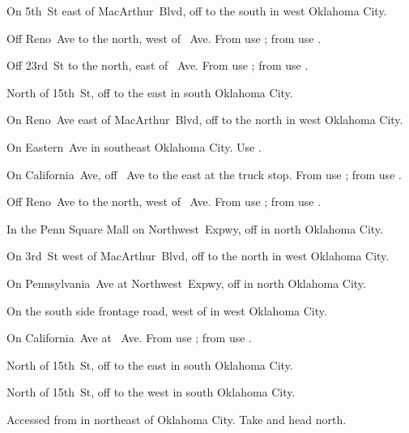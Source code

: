 
\begin{LocationList}

On 5th~St east of MacArthur~Blvd, off   to the south in west Oklahoma City.

Off Reno~Ave to the north, west of \MLKing~Ave.
From  use ; from  use .
	
Off 23rd~St to the north, east of \MLKing~Ave.
From  use ; from  use .

North of 15th~St, off   to the east in south Oklahoma City.

On Reno~Ave east of MacArthur~Blvd, off   to the north in west Oklahoma City.

\Location{\GarageHQ \Garage}
On Eastern~Ave in southeast Oklahoma City.
Use  .

On California~Ave, off \MLKing~Ave to the east at the truck stop.
From  use ; from  use .

Off Reno~Ave to the north, west of \MLKing~Ave.
From  use ; from  use .

In the Penn Square Mall on Northwest~Expwy, off  in north Oklahoma City.

On 3rd~St west of MacArthur~Blvd, off   to the north in west Oklahoma City.

On Pennsylvania~Ave at Northwest~Expwy, off  in north Oklahoma City.

On the south side  frontage road, west of  in west Oklahoma City.

\Location{\TruckStop \Gas \Rest \Service \Weigh}
On California~Ave at \MLKing~Ave.
From  use ; from  use .

North of 15th~St, off   to the east in south Oklahoma City.

North of 15th~St, off   to the west in south Oklahoma City.

Accessed from  in  northeast of Oklahoma City.
Take   and head north.

\end{LocationList}
